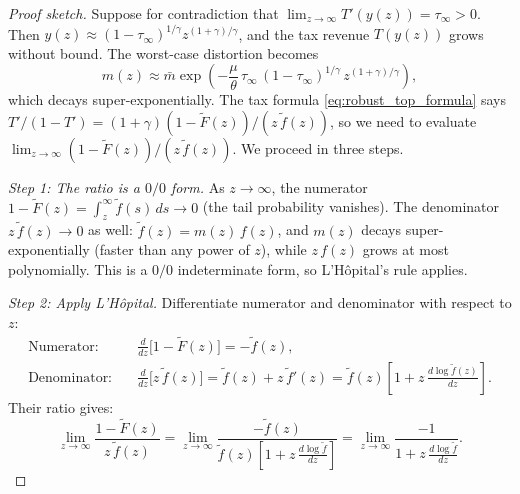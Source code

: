 \documentclass[12pt,a4paper]{article}
\theoremstyle{definition}
\theoremstyle{plain}
\theoremstyle{remark}
\begin{document}
\begin{proof}[Proof sketch]
Suppose for contradiction that $\lim_{z \to \infty} T'(y(z)) = \tau_\infty > 0$. Then $y(z) \approx (1-\tau_\infty)^{1/\gamma} z^{(1+\gamma)/\gamma}$, and the tax revenue $T(y(z))$ grows without bound. The worst-case distortion becomes
\[
  m(z) \approx \bar{m}\exp\!\left(-\frac{\mu}{\theta}\, \tau_\infty\, (1-\tau_\infty)^{1/\gamma}\, z^{(1+\gamma)/\gamma}\right),
\]
which decays super-exponentially. The tax formula \eqref{eq:robust_top_formula} says $T'/(1-T') = (1+\gamma)(1-\widetilde{F}(z))/(z\,\widetilde{f}(z))$, so we need to evaluate $\lim_{z \to \infty}(1-\widetilde{F}(z))/(z\,\widetilde{f}(z))$. We proceed in three steps.

\emph{Step 1: The ratio is a $0/0$ form.} As $z \to \infty$, the numerator $1 - \widetilde{F}(z) = \int_z^\infty \widetilde{f}(s)\,ds \to 0$ (the tail probability vanishes). The denominator $z\,\widetilde{f}(z) \to 0$ as well: $\widetilde{f}(z) = m(z)\,f(z)$, and $m(z)$ decays super-exponentially (faster than any power of $z$), while $z\,f(z)$ grows at most polynomially. This is a $0/0$ indeterminate form, so L'H\^{o}pital's rule applies.

\emph{Step 2: Apply L'H\^{o}pital.} Differentiate numerator and denominator with respect to $z$:
\begin{align*}
  \text{Numerator:} &\quad \frac{d}{dz}\bigl[1 - \widetilde{F}(z)\bigr] = -\widetilde{f}(z), \\
  \text{Denominator:} &\quad \frac{d}{dz}\bigl[z\,\widetilde{f}(z)\bigr] = \widetilde{f}(z) + z\,\widetilde{f}'(z) = \widetilde{f}(z)\left[1 + z\,\frac{d\log\widetilde{f}(z)}{dz}\right].
\end{align*}
Their ratio gives:
\[
  \lim_{z \to \infty} \frac{1 - \widetilde{F}(z)}{z\,\widetilde{f}(z)}
  = \lim_{z \to \infty} \frac{-\widetilde{f}(z)}{\widetilde{f}(z)\left[1 + z\,\frac{d\log\widetilde{f}}{dz}\right]}
  = \lim_{z \to \infty} \frac{-1}{1 + z\,\frac{d\log\widetilde{f}}{dz}}.
\]


\end{proof}
\end{document}
